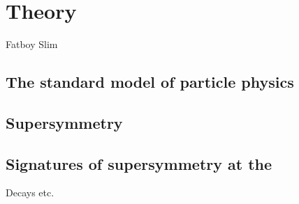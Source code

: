 \chapter{Theory}
\label{chap:theory}

{Fatboy Slim}

\section{The standard model of particle physics}
\label{sec:sm}


\section{Supersymmetry}
\label{sec:susy}


\section{Signatures of supersymmetry at the \LHC}

Decays etc.
